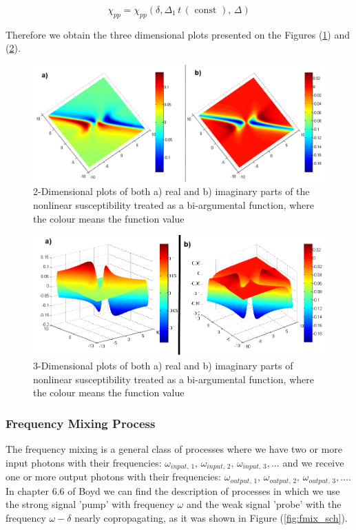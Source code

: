 \documentclass[12pt,twoside,a4paper]{article}
\numberwithin{equation}{subsection}
\numberwithin{figure}{subsection}
\begin{document}
\begin{equation} \label{eq:pnp_2args}
  \chi_{pp} = \chi_{pp}(\delta, \Delta_1 \, t \, (\text{ const }), \,\Delta )
\end{equation}

Therefore we obtain the three dimensional plots presented on the Figures (\ref{fig:physical_pnp_2d}) and (\ref{fig:physical_pnp_3d}).

\begin{figure}
  \includegraphics[width=150mm]{img/pnp_2d.png}
  \caption{2-Dimensional plots of both a) real and b) imaginary parts of the nonlinear susceptibility treated as a bi-argumental
  function, where the colour means the function value
  \label{fig:physical_pnp_2d}}
\end{figure}

\begin{figure} 
  \includegraphics[width=150mm]{img/pnp_3d.png}
  \caption{3-Dimensional plots of both a) real and b) imaginary parts of nonlinear susceptibility treated as a bi-argumental
  function, where the colour means the function value
  \label{fig:physical_pnp_3d}}
\end{figure}


\subsubsection*{Frequency Mixing Process}

The frequency mixing is a general class of processes where we have two or more input photons with their frequencies:
${\omega_{input, \,1}}, \,{\omega_{input, \,2}}, \,{\omega_{input, \,3}}, \ldots $ and we receive one or more output photons with
their frequencies: ${\omega_{output, \,1}}, \,{\omega_{output,\,2}}, \,{\omega_{output, \,3}}, \ldots $. In chapter 6.6 of Boyd
\cite{boyd_nlo} we can find the description of processes in which we use the strong signal 'pump' with frequency $\omega$
and the weak signal 'probe' with the frequency $\omega  - \delta $ nearly copropagating, as it was shown in Figure
(\ref{fig:fmix_sch}).
\end{document}
